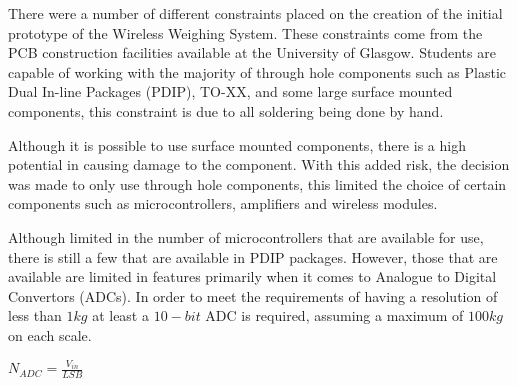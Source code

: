 There were a number of different constraints placed on the creation of the initial prototype of the Wireless Weighing System. These constraints come from the PCB construction facilities available at the University of Glasgow. Students are capable of working with the majority of through hole components such as Plastic Dual In-line Packages (PDIP), TO-XX, and some large surface mounted components, this constraint is due to all soldering being done by hand.

Although it is possible to use surface mounted components, there is a high potential in causing damage to the component. With this added risk, the decision was made to only use through hole components, this limited the choice of certain components such as microcontrollers, amplifiers and wireless modules.

Although limited in the number of microcontrollers that are available for use, there is still a few that are available in PDIP packages. However, those that are available are limited in features primarily when it comes to Analogue to Digital Convertors (ADCs). In order to meet the requirements of having a resolution of less than $1kg$ at least a $10-bit$ ADC is required, assuming a maximum of $100kg$ on each scale.
\begin{center}
$N_{ADC} = \frac{V_{in}}{LSB}$
\end{center}